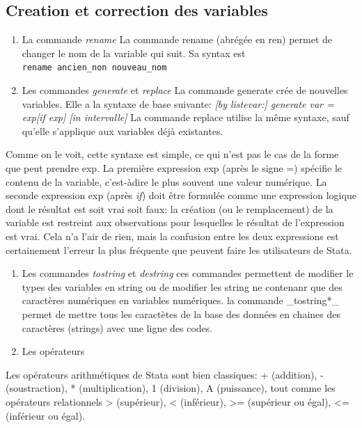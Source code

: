 \documentclass[
]{book}
\begin{document}
\hypertarget{creation-et-correction-des-variables}{%
\subsection{Creation et correction des variables}\label{creation-et-correction-des-variables}}

\begin{enumerate}
\def\labelenumi{(\arabic{enumi})}
\item
  La commande \emph{rename}
  La commande rename (abrégée
  en ren) permet de changer le nom de la variable qui suit. Sa syntax est
  \texttt{rename\ ancien\_non\ nouveau\_nom}
\item
  Les commandes \emph{generate} et \emph{replace}
  La commande generate crée de nouvelles variables. Elle a la syntaxe de base suivante:
  \emph{{[}by listevar:{]} generate var = exp{[}if exp{]} {[}in intervalle{]}}
  La commande replace utilise la même syntaxe, sauf qu'elle s'applique aux variables déjà existantes.
\end{enumerate}

Comme on le voit, cette syntaxe est simple, ce qui n'est pas le cas de la forme que peut prendre exp. La première expression exp (après le signe =) spécifie le contenu de la variable, c'est-àdire le plus souvent une valeur numérique. La seconde expression exp (après \emph{if}) doit être formulée comme une expression logique dont le résultat est soit vrai soit faux: la création (ou le remplacement) de la variable est restreint aux observations pour lesquelles le résultat de l'expression est vrai. Cela n'a l'air de rien, mais la confusion entre les deux expressions est certainement l'erreur la plus fréquente que peuvent faire les utilisateurs de Stata.

\begin{enumerate}
\def\labelenumi{(\arabic{enumi})}
\setcounter{enumi}{2}
\item
  Les commandes \emph{tostring} et \emph{destring}
  ces commandes permettent de modifier le types des variables en string ou de modifier les string ne contenanr que des caractères numériques en variables numériques.
  la commande \_tostring*\_ permet de mettre tous les caractètes de la base des données en chaines des caractères (strings) avec une ligne des codes.
\item
  Les opérateurs
\end{enumerate}

Les opérateurs arithmétiques de Stata sont bien classiques:
+ (addition), - (soustraction), * (multiplication), 1 (division),
A (puissance), tout comme les opérateurs relationnels
\textgreater{} (supérieur), \textless{} (inférieur), \textgreater= (supérieur ou égal), \textless= (inférieur
ou égal).
\end{document}
